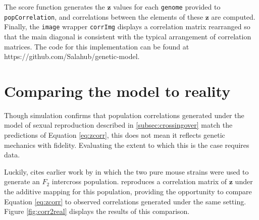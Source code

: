 \documentclass{article}
\newcommand{\code}[1]{\texttt{#1}}
\newcommand{\ve}[1]{\mathbf{#1}}           %
\begin{document}
The score function generates the $\ve{z}$ values for each \code{genome} provided to \code{popCorrelation}, and correlations between the elements of these $\ve{z}$ are computed. Finally, the \code{image} wrapper \code{corrImg} displays a correlation matrix rearranged so that the main diagonal is consistent with the typical arrangement of correlation matrices. The code for this implementation can be found at https://github.com/Salahub/genetic-model.

\section{Comparing the model to reality} \label{subsec:model2real}

Though simulation confirms that population correlations generated under the model of sexual reproduction described in \ref{subsec:crossingover} match the predictions of Equation \ref{eq:zcorr}, this does not mean it reflects genetic mechanics with fidelity. Evaluating the extent to which this is the case requires data.

Luckily, \cite{cheverud2001} cites earlier work by \cite{cheverudetal2001} in which the two pure mouse strains were used to generate an $F_2$ intercross population. \cite{cheverud2001} reproduces a correlation matrix of $\ve{z}$ under the additive mapping for this population, providing the opportunity to compare Equation \ref{eq:zcorr} to observed correlations generated under the same setting. Figure \ref{fig:corr2real} displays the results of this comparison.
\end{document}
